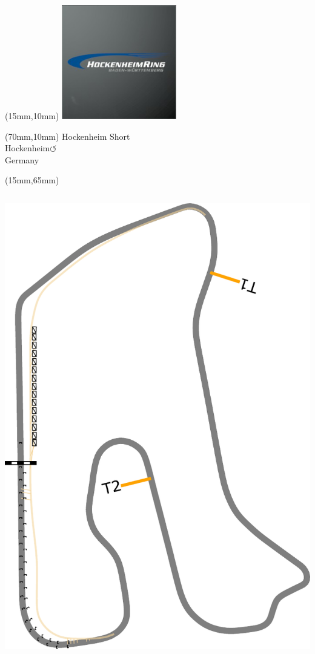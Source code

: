 \null\newpage
\begin{textblock*}{50mm}(15mm,10mm)%
\includegraphics[width=50mm]{LG/2015-05-20_00082.png}
\end{textblock*}
\begin{textblock*}{130mm}(70mm,10mm)%
{\fontsize{20}{20}\selectfont Hockenheim Short\\}
{\fontsize{16}{16}\selectfont Hockenheim\hfill \huge$\circlearrowleft$\\}
{\fontsize{12}{12}\selectfont Germany\\}
\end{textblock*}
\begin{textblock*}{185mm}(15mm,65mm)%
\centering
\mbox{\includegraphics[width=185mm,height=210mm,keepaspectratio]{PT/HOSH.pdf}}
\end{textblock*}
